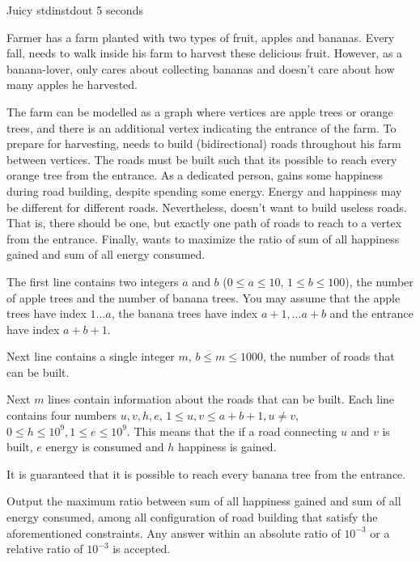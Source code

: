\begin{problem}{Juicy}
{stdin}{stdout}
{5 seconds}{}{}

Farmer \pittoresque has a farm planted with two types of fruit, apples and bananas. Every fall, \pittoresque needs to walk inside his farm to harvest these delicious fruit. However, as a banana-lover, \pittoresque only cares about collecting bananas and doesn't care about how many apples he harvested. 

The farm can be modelled as a graph where vertices are apple trees or orange trees, and there is an additional vertex indicating the entrance of the farm. To prepare for harvesting, \pittoresque needs to build (bidirectional) roads throughout his farm between vertices. The roads must be built such that its possible to reach every orange tree from the entrance. As a dedicated person, \pittoresque gains some happiness during road building, despite spending some energy. Energy and happiness may be different for different roads. Nevertheless, \pittoresque doesn't want to build useless roads. That is, there should be one, but exactly one path of roads to reach to a vertex from the entrance. Finally, \pittoresque wants to maximize the ratio of sum of all happiness gained and sum of all energy consumed.

\InputFile

The first line contains two integers $a$ and $b$ ($0 \le a \le 10$, $1 \le b \le 100$), the number of apple trees and the number of banana trees. You may assume that the apple trees have index $1 ... a$, the banana trees have index $a + 1, ... a + b$ and the entrance have index $a + b + 1$.

Next line contains a single integer $m$, $b \leq m \leq 1000$, the number of roads that can be built.

Next $m$ lines contain information about the roads that can be built. Each line contains four numbers $u, v, h, e$, $1 \le u, v \le a + b + 1, u \neq v$, $0 \le h \le 10^9, 1 \le e \le 10^9$. This means that the if a road connecting $u$ and $v$ is built, $e$ energy is consumed and $h$ happiness is gained.

It is guaranteed that it is possible to reach every banana tree from the entrance.

\OutputFile

Output the maximum ratio between sum of all happiness gained and sum of all energy consumed, among all configuration of road building that satisfy the aforementioned constraints. Any answer within an absolute ratio of $10^{-3}$ or a relative ratio of $10^{-3}$ is accepted.

\Examples

\begin{example}
%
\end{example}

\begin{example}
%
\end{example}



\end{problem}